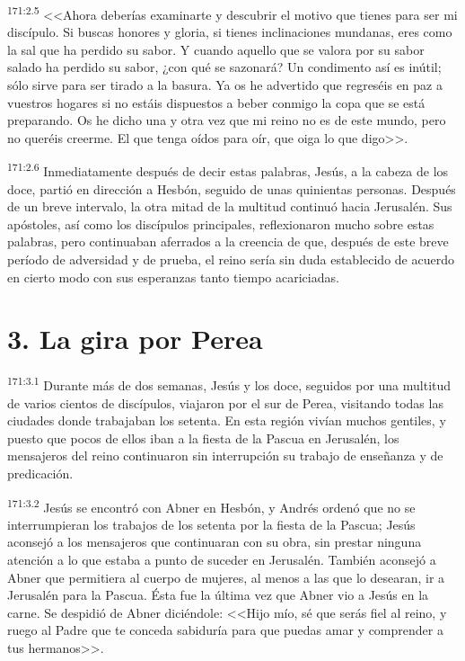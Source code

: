 \par 
\textsuperscript{171:2.5} <<Ahora deberías examinarte y descubrir el motivo que tienes para ser mi discípulo. Si buscas honores y gloria, si tienes inclinaciones mundanas, eres como la sal que ha perdido su sabor. Y cuando aquello que se valora por su sabor salado ha perdido su sabor, ¿con qué se sazonará? Un condimento así es inútil; sólo sirve para ser tirado a la basura. Ya os he advertido que regreséis en paz a vuestros hogares si no estáis dispuestos a beber conmigo la copa que se está preparando. Os he dicho una y otra vez que mi reino no es de este mundo, pero no queréis creerme. El que tenga oídos para oír, que oiga lo que digo>>.

\par 
\textsuperscript{171:2.6} Inmediatamente después de decir estas palabras, Jesús, a la cabeza de los doce, partió en dirección a Hesbón, seguido de unas quinientas personas. Después de un breve intervalo, la otra mitad de la multitud continuó hacia Jerusalén. Sus apóstoles, así como los discípulos principales, reflexionaron mucho sobre estas palabras, pero continuaban aferrados a la creencia de que, después de este breve período de adversidad y de prueba, el reino sería sin duda establecido de acuerdo en cierto modo con sus esperanzas tanto tiempo acariciadas.

\section*{3. La gira por Perea}
\par 
\textsuperscript{171:3.1} Durante más de dos semanas, Jesús y los doce, seguidos por una multitud de varios cientos de discípulos, viajaron por el sur de Perea, visitando todas las ciudades donde trabajaban los setenta. En esta región vivían muchos gentiles, y puesto que pocos de ellos iban a la fiesta de la Pascua en Jerusalén, los mensajeros del reino continuaron sin interrupción su trabajo de enseñanza y de predicación.

\par 
\textsuperscript{171:3.2} Jesús se encontró con Abner en Hesbón, y Andrés ordenó que no se interrumpieran los trabajos de los setenta por la fiesta de la Pascua; Jesús aconsejó a los mensajeros que continuaran con su obra, sin prestar ninguna atención a lo que estaba a punto de suceder en Jerusalén. También aconsejó a Abner que permitiera al cuerpo de mujeres, al menos a las que lo desearan, ir a Jerusalén para la Pascua. Ésta fue la última vez que Abner vio a Jesús en la carne. Se despidió de Abner diciéndole: <<Hijo mío, sé que serás fiel al reino, y ruego al Padre que te conceda sabiduría para que puedas amar y comprender a tus hermanos>>.

